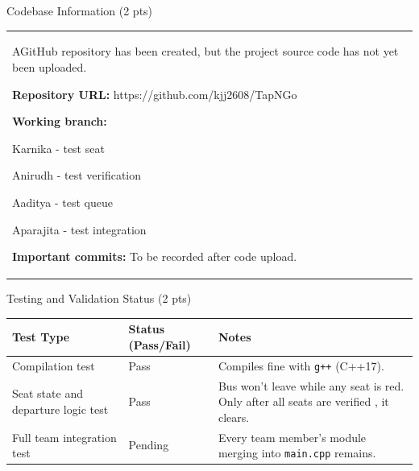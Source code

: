 \documentclass[12pt,a4paper]{article}
\newcommand{\sectiontitle}[1]{%
    {\color{GEUBlue}
    \fontsize{18}{22}\selectfont #1}
}
\newcommand{\instruction}[1]{%
    {\color{InstructionGrey}
    \fontsize{10.5}{13}\selectfont #1}
}
\newcommand{\answerbox}[2]{%
    \begin{tabularx}{\textwidth}{
        |>{\raggedright\arraybackslash}X|}
        \hline
        \parbox[t][#1][t]{\dimexpr\linewidth-12pt\relax}{
            \vspace{5pt}
            \fontsize{11}{13}\selectfont #2
        }\\
        \hline
    \end{tabularx}
}
\begin{document}

\vspace*{0.20cm}

\sectiontitle{Codebase Information (2 pts)}

\vspace{0.05cm}


\vspace{0.20cm}

\answerbox{4cm}{AGitHub repository has been created, but the project source code has not yet been uploaded.

 \textbf{Repository URL:} https://github.com/kjj2608/TapNGo
 
 \textbf{Working branch:} 
 
Karnika - test seat

Anirudh - test verification

Aaditya - test queue

Aparajita - test integration

\textbf{Important commits:} To be recorded after code upload.}

\vspace{0.65cm}

\sectiontitle{Testing and Validation Status (2 pts)}

\vspace{0.05cm}


\vspace{0.30cm}

\begin{tabularx}{\textwidth}{
|>{\raggedright\arraybackslash}p{}
|>{\raggedright\arraybackslash}p{}
|>{\raggedright\arraybackslash}X|
}
\hline

\textbf{Test Type} &
\textbf{Status (Pass/Fail)} &
\textbf{Notes}
\\
\hline

Compilation test &
Pass &
Compiles fine with \texttt{g++} (C++17). \\
\hline

Seat state and departure logic test &
Pass &
Bus won't leave while any seat is red. Only after all seats are verified , it clears. \\
\hline

Full team integration test &
Pending &
Every team member's module merging  into \texttt{main.cpp} remains.  \\
\hline
\end{tabularx}
\end{document}
